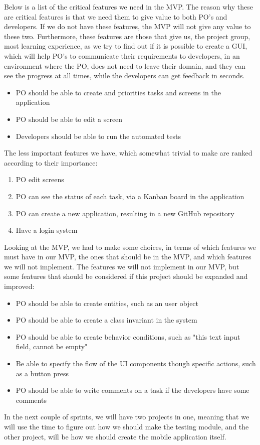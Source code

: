 Below is a list of the critical features we need in the MVP.
The reason why these are critical features is that we need them to give value to both PO's and developers.
If we do not have these features, the MVP will not give any value to these two.
Furthermore, these features are those that give us, the project group, most learning experience, as we try to find out if it is possible to create a GUI, which will help PO's to communicate their requirements to developers, in an environment where the PO, does not need to leave their domain, and they can see the progress at all times, while the developers can get feedback in seconds.

\begin{itemize}
    \item PO should be able to create and priorities tasks and screens in the application
    \item PO should be able to edit a screen
    \item Developers should be able to run the automated tests
\end{itemize}

The less important features we have, which somewhat trivial to make are ranked according to their importance:

\begin{enumerate}
    \item PO edit screens
    \item PO can see the status of each task, via a Kanban board in the application
    \item PO can create a new application, resulting in a new GitHub repository
    \item Have a login system
\end{enumerate}

Looking at the MVP, we had to make some choices, in terms of which features we must have in our MVP, the ones that should be in the MVP, and which features we will not implement.
The features we will not implement in our MVP, but some features that should be considered if this project should be expanded and improved:

\begin{itemize}
    \item PO should be able to create entities, such as an user object
    \item PO should be able to create a class invariant in the system
    \item PO should be able to create behavior conditions, such as "this text input field, cannot be empty"
    \item Be able to specify the flow of the UI components though specific actions, such as a button press
    \item PO should be able to write comments on a task if the developers have some comments
\end{itemize}

In the next couple of sprints, we will have two projects in one, meaning that we will use the time to figure out how we should make the testing module, and the other project, will be how we should create the mobile application itself.
